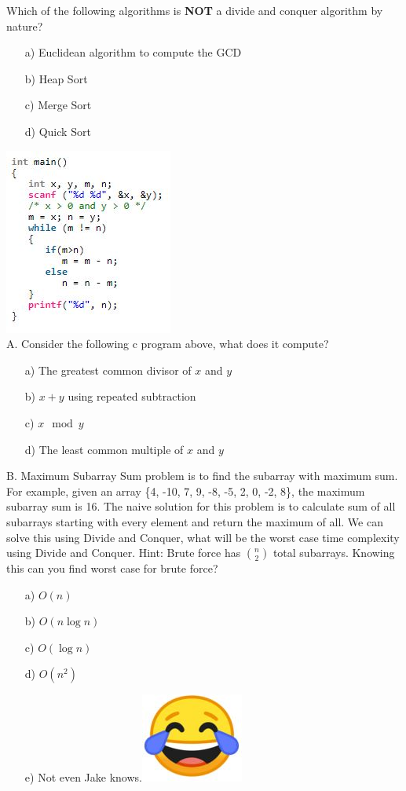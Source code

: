 \documentclass[12pt]{article}
\begin{document}
Which of the following algorithms is \textbf{NOT} a divide and conquer algorithm by nature?\\
\begin{enumerate}
    \item[a)]Euclidean algorithm to compute the GCD
    \item[b)]Heap Sort
    \item[c)]Merge Sort
    \item[d)]Quick Sort
\end{enumerate}
\newpage
\noindent \includegraphics{c.jpg}\\
A. Consider the following c program above, what does it compute?
\begin{enumerate}
    \item[a)]The greatest common divisor of $x$ and $y$
    \item[b)]$x + y$ using repeated subtraction
    \item[c)]$x \mod y$ 
    \item[d)]The least common multiple of $x$ and $y$
\end{enumerate}
B. Maximum Subarray Sum problem is to find the subarray with maximum sum. For example, given an array \{4, -10, 7, 9, -8, -5, 2, 0, -2, 8\}, the maximum subarray sum is 16. The naive solution for this problem is to calculate sum of all subarrays starting with every element and return the maximum of all. We can solve this using Divide and Conquer, what will be the worst case time complexity using Divide and Conquer. Hint: Brute force has $\binom{n}{2}$ total subarrays. Knowing this can you find worst case for brute force?\\
\begin{enumerate}
    \item[a)]$O(n)$
    \item[b)]$O(n\log{n})$
    \item[c)]$O(\log{n})$
    \item[d)]$O(n^2)$
    \item[e)]Not even Jake knows.\includegraphics[scale = 0.2]{cry.jpg} 
\end{enumerate}
\end{document}
